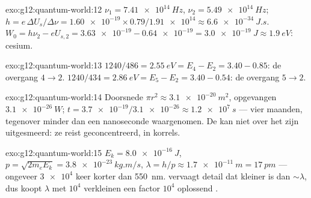 \begin{solution}{exo:g12:quantum-world:12}
$\nu_1 = \qty{7.41e14}{Hz}$, $\nu_2 = \qty{5.49e14}{Hz}$;
$h = e\,\Delta U_s/\Delta\nu = \num{1.60e-19} \times 0.79 /
\num{1.91e14} \approx \qty{6.6e-34}{J.s}$. $W_0 = h\nu_2 - eU_{s,2} =
\num{3.63e-19} - \num{0.64e-19} = \qty{3.0e-19}{J} \approx \qty{1.9}{eV}$:
cesium.
\end{solution}

\begin{solution}{exo:g12:quantum-world:13}
$1240/486 = \qty{2.55}{eV} = E_4 - E_2 = 3.40 - 0.85$: de overgang
$4 \to 2$. $1240/434 = \qty{2.86}{eV} = E_5 - E_2 = 3.40 - 0.54$: de overgang
$5 \to 2$.
\end{solution}

\begin{solution}{exo:g12:quantum-world:14}
Doorsnede $\pi r^2 \approx \qty{3.1e-20}{m^2}$, opgevangen 
$\qty{3.1e-26}{W}$; $t = \num{3.7e-19}/\num{3.1e-26} \approx \qty{1.2e7}{s}$
--- vier maanden, tegenover minder dan een nanoseconde waargenomen. De 
kan niet over het  zijn uitgesmeerd: ze reist geconcentreerd, in
korrels.
\end{solution}

\begin{solution}{exo:g12:quantum-world:15}
$E_k = \qty{8.0e-16}{J}$, $p = \sqrt{2m_e E_k} = \qty{3.8e-23}{kg.m/s}$,
$\lambda = h/p \approx \qty{1.7e-11}{m} = \qty{17}{pm}$ --- ongeveer
$\num{3e4}$ keer korter dan \qty{550}{nm}.  vervaagt detail dat kleiner
is dan $\sim\lambda$, dus koopt $\lambda$ met $10^4$ verkleinen een factor
$10^4$ oplossend .
\end{solution}

